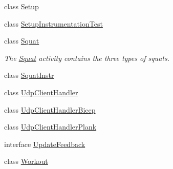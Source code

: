 \begin{DoxyCompactItemize}
class \mbox{\hyperlink{classcom_1_1example_1_1trainawearapplication_1_1_setup}{Setup}}
\item 
class \mbox{\hyperlink{classcom_1_1example_1_1trainawearapplication_1_1_setup_instrumentation_test}{Setup\+Instrumentation\+Test}}
\item 
class \mbox{\hyperlink{classcom_1_1example_1_1trainawearapplication_1_1_squat}{Squat}}
\begin{DoxyCompactList}\small\item\em The \mbox{\hyperlink{classcom_1_1example_1_1trainawearapplication_1_1_squat}{Squat}} activity contains the three types of squats. \end{DoxyCompactList}\item 
class \mbox{\hyperlink{classcom_1_1example_1_1trainawearapplication_1_1_squat_instr}{Squat\+Instr}}
\item 
class \mbox{\hyperlink{classcom_1_1example_1_1trainawearapplication_1_1_udp_client_handler}{Udp\+Client\+Handler}}
\item 
class \mbox{\hyperlink{classcom_1_1example_1_1trainawearapplication_1_1_udp_client_handler_bicep}{Udp\+Client\+Handler\+Bicep}}
\item 
class \mbox{\hyperlink{classcom_1_1example_1_1trainawearapplication_1_1_udp_client_handler_plank}{Udp\+Client\+Handler\+Plank}}
\item 
interface \mbox{\hyperlink{interfacecom_1_1example_1_1trainawearapplication_1_1_update_feedback}{Update\+Feedback}}
\item 
class \mbox{\hyperlink{classcom_1_1example_1_1trainawearapplication_1_1_workout}{Workout}}
\end{DoxyCompactItemize}
